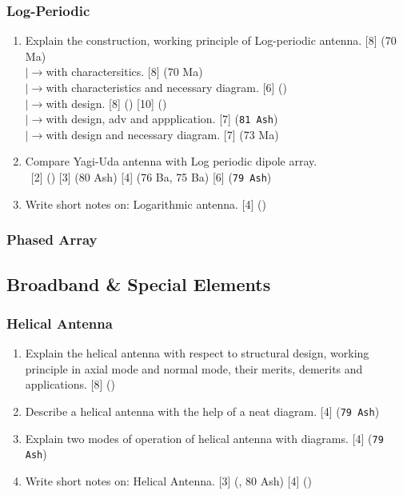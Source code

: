\documentclass[12pt]{article}
\newcommand{\lb}{\\$\left|\rightarrow\right.$}
\newcommand{\enter}{\\\textcolor{white}{1}}
\begin{document}
    \subsubsection{Log-Periodic}
      \begin{enumerate}
        \item Explain the construction, working principle of Log-periodic antenna. \hfill [8] (70 Ma)
          \lb with charactersitics. \hfill [8] (70 Ma)
          \lb with characteristics and necessary diagram. \hfill [6] ()
          \lb with design. \hfill [8] () [10] ()
          \lb with design, adv and appplication. \hfill [7] (\texttt{81 Ash})
          \lb with design and necessary diagram. \hfill [7] (73 Ma)

        \item Compare Yagi-Uda antenna with Log periodic dipole array.
          \enter\hfill [2] () [3] (80 Ash) [4] (76 Ba, 75 Ba) [6] (\texttt{79 Ash})

        \item Write short notes on: Logarithmic antenna. \hfill [4] ()
      \end{enumerate}

    \subsubsection{Phased Array}

    \subsection{Broadband \& Special Elements}
    \subsubsection{Helical Antenna}
      \begin{enumerate}
        \item Explain the helical antenna with respect to structural design, working principle in axial mode and normal mode, their merits, demerits and applications. \hfill [8] ()

        \item Describe a helical antenna with the help of a neat diagram. \hfill [4] (\texttt{79 Ash})

        \item Explain two modes of operation of helical antenna with diagrams. \hfill [4] (\texttt{79 Ash})

        \item Write short notes on: Helical Antenna. \hfill [3] (, 80 Ash) [4] ()
      \end{enumerate}
\end{document}
